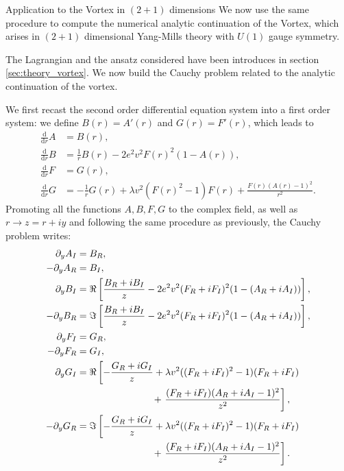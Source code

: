 \begin{section}{Application to the Vortex in $(2+1)$ dimensions}
  We now use the same procedure to compute the numerical analytic
  continuation of the Vortex, which arises in $(2+1)$ dimensional
  Yang-Mills theory with $U(1)$ gauge symmetry.

  The Lagrangian and the ansatz considered have been introduces in
  section \ref{sec:theory_vortex}. We now build the Cauchy problem related to the
  analytic continuation of the vortex.

  We first recast the second order differential equation system into a
  first order system: we define $B(r)=A'(r)$ and $G(r) = F'(r)$, which leads to
  \begin{align}
    \frac{\mathrm{d}}{\mathrm{d}r}A &= B(r),\\
    \frac{\mathrm{d}}{\mathrm{d}r}B &= \frac{1}{r}B(r)-2e^2 v^2F(r)^2(1-A(r)),\\
    \frac{\mathrm{d}}{\mathrm{d}r}F &= G(r),\\
    \frac{\mathrm{d}}{\mathrm{d}r}G &= -\frac{1}{r}G(r)+\lambda v^2(F(r)^2-1)F(r) +\frac{F(r)(A(r)-1)^2}{r^2}.
  \end{align}
  Promoting all the functions $A,B,F,G$ to the complex field, as well
  as $r\to z=r+iy$ and following the same procedure as previously, the
  Cauchy problem writes:
  \begin{align}
    \partial_y A_I &= B_R,\\
    -\partial_y A_R &= B_I,\\
    \partial_y B_I &= \Re\left[\frac{B_R+iB_I}{z}-2e^2v^2(F_R+iF_I)^2(1-(A_R+iA_I))\right],\\
    -\partial_y B_R &= \Im\left[\frac{B_R+iB_I}{z}-2e^2v^2(F_R+iF_I)^2(1-(A_R+iA_I))\right],\\
    \partial_y F_I &= G_R,\\
    -\partial_y F_R &= G_I,\\
    \partial_y G_I &= \Re\left[-\frac{G_R+iG_I}{z}+\lambda v^2((F_R+iF_I)^2-1)(F_R+iF_I)\right.\\
      &\hphantom{= \Re\left[-\frac{G_R+iG_I}{z}\right.}+\left.\frac{(F_R+iF_I)(A_R+iA_I-1)^2}{z^2}\right],\\
    -\partial_y G_R &= \Im\left[-\frac{G_R+iG_I}{z}+\lambda v^2((F_R+iF_I)^2-1)(F_R+iF_I)\right.\\
      &\hphantom{= \Re\left[-\frac{G_R+iG_I}{z}\right.}+\left.\frac{(F_R+iF_I)(A_R+iA_I-1)^2}{z^2}\right].\\
  \end{align}


\end{section}
